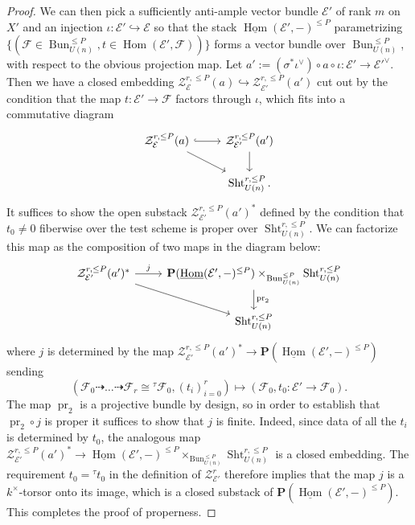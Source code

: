\documentclass[reqno]{amsart}
\numberwithin{equation}{section}
\newcommand{\ul}[1]{\underline{#1}}
\newcommand{\Cal}[1]{\mathcal{#1}}
\newcommand{\ft}{{}^{\tau}}
\newcommand{\co}{\colon}
\newcommand{\PP}{\mathbf{P}}
\newcommand{\inj}{\hookrightarrow}
\DeclareMathOperator{\Hom}{Hom}
\DeclareMathOperator{\Bun}{Bun}
\DeclareMathOperator{\Sht}{Sht}
\DeclareMathOperator{\pr}{pr}
\newcommand\cE{\mathcal{E}}
\newcommand\cZ{\mathcal{Z}}
\theoremstyle{remark}
\numberwithin{equation}{section}
\begin{document}
\begin{proof}
We can then pick a sufficiently anti-ample vector bundle $\cE'$ of rank $m$ on $X'$ and an injection $\iota \co \Cal{E}' \inj \Cal{E} $ so that the stack $\ul{\Hom}(\Cal{E}', -)^{\leq P}$ parametrizing $\{(\Cal{F} \in \Bun_{U(n)}^{\leq P}, t \in \Hom(\Cal{E}', \Cal{F}))\}$ forms a vector bundle over $\Bun_{U(n)}^{\leq P}$, with respect to the obvious projection map. Let $a' := (\sigma^{*} \iota^{\vee}) \circ a \circ \iota \co \Cal{E}' \rightarrow \Cal{E}'^\vee$.  Then we have a closed embedding $\Cal{Z}_{\Cal{E}}^{r, \leq P}(a)  \inj \cZ_{\Cal{E}'}^{r, \leq P}(a')$ cut out by the condition that the map $t \co \Cal{E}' \rightarrow \Cal{F}$ factors through $\iota$, which fits into a commutative diagram 
\[
\begin{tikzcd}
\Cal{Z}_{\Cal{E}}^{r, \leq P}(a)  \ar[r, hook] \ar[dr] & \cZ_{\Cal{E}'}^{r, \leq P}(a') \ar[d] \\
& \Sht_{U(n)}^{r, \leq P}.
\end{tikzcd}
\]
It suffices to show the open substack $\cZ_{\Cal{E}'}^{r, \leq P}(a')^*$ defined by the condition that  $t_{0}\ne0$ fiberwise over the test scheme is proper over $ \Sht_{U(n)}^{r, \leq P} $. We can factorize this map as the composition of two maps in the diagram below: 
\[
\begin{tikzcd} 
\cZ_{\Cal{E}'}^{r, \leq P}(a')^* \ar[dr] \ar[r, "j"] & \PP(\ul{\Hom}(\Cal{E}', -)^{\leq P}) \times_{\Bun_{U(n)}^{\leq P}} \Sht_{U(n)}^{r, \leq P}\ar[d, "\pr_2"] \\
& \Sht_{U(n)}^{r, \leq P}
\end{tikzcd}
\]
where $j$ is determined by the map $\cZ_{\Cal{E}'}^{r, \leq P}(a')^* \rightarrow \PP(\ul{\Hom}(\Cal{E}', -)^{\leq P})$ sending 
\[
(\Cal{F}_0 \dashrightarrow \ldots \dashrightarrow \Cal{F}_r \cong \ft \Cal{F}_0, (t_i)_{i=0}^r) \mapsto (\Cal{F}_0 , t_0 \co \Cal{E}' \rightarrow \Cal{F}_0).
\]
The map $\pr_2$ is a projective bundle by design, so in order to establish that $\pr_2 \circ j$ is proper it suffices to show that $j$ is finite. Indeed, since data of all the $t_i$ is determined by $t_0$, the analogous map $\cZ_{\Cal{E}'}^{r, \leq P}(a')^*  \rightarrow \ul{\Hom}(\Cal{E}', -)^{\leq P} \times_{\Bun_{U(n)}^{\leq P}} \Sht_{U(n)}^{r, \leq P}$ is a closed embedding. The requirement $t_0 = \ft t_0$ in the definition of $\cZ_{\Cal{E}'}^{r}$ therefore implies that the map $j$ is a $k^{\times}$-torsor onto its image, which is a closed substack of $\PP(\ul{\Hom}(\Cal{E}', -)^{\leq P})$. This completes the proof of properness. 


\end{proof}
\end{document}
